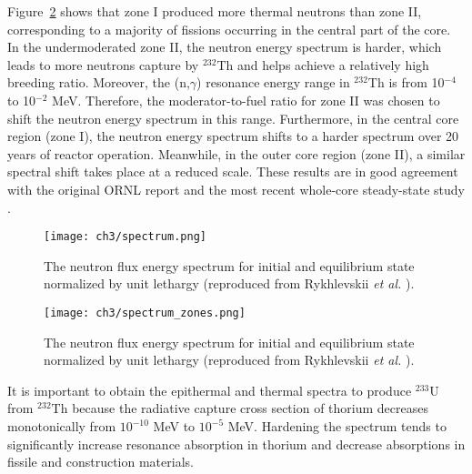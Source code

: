 Figure~\ref{fig:spectrum_zones} shows that zone I produced more thermal  
neutrons than zone II, corresponding to a majority of fissions occurring in 
the central part of the core. In the undermoderated zone II, the neutron 
energy spectrum is harder, which leads to more neutrons capture by $^{232}$Th 
and helps achieve a relatively high breeding ratio. Moreover, the (n,$\gamma$) 
resonance energy range in $^{232}$Th is from 10$^{-4}$ to 10$^{-2}$ MeV. 
Therefore, the moderator-to-fuel ratio for zone II was chosen to shift the 
neutron energy spectrum in this range. Furthermore, in the central core region 
(zone I), the neutron energy spectrum shifts to a harder spectrum over 20 
years of reactor operation. Meanwhile, in the outer core region (zone II), a 
similar spectral shift takes place at a reduced scale. These results are in  
good agreement with the original ORNL report \cite{robertson_conceptual_1971} 
and the most recent whole-core steady-state study \cite{park_whole_2015}.
\begin{figure}[htp!] %
	\centering
	\texttt{[image: ch3/spectrum.png]}
	\caption{The neutron flux energy spectrum for initial and equilibrium  
	state normalized by unit lethargy (reproduced from Rykhlevskii 
	\emph{et al.} \cite{rykhlevskii_modeling_2019}).}
	\label{fig:spectrum}
\end{figure}
\begin{figure}[htp!] %
	\centering
	\texttt{[image: ch3/spectrum\_zones.png]} 
	\caption{The neutron flux energy spectrum for initial and equilibrium  
		state normalized by unit lethargy (reproduced from 
		Rykhlevskii \emph{et al.} \cite{rykhlevskii_modeling_2019}).}
	\label{fig:spectrum_zones}
\end{figure}

It is important to obtain the epithermal and thermal spectra to produce 
$^{233}$U from $^{232}$Th because the radiative capture cross section of 
thorium decreases monotonically from $10^{-10}$ MeV to $10^{-5}$ MeV. 
Hardening the spectrum tends to significantly increase resonance absorption in 
thorium and decrease absorptions in fissile and construction materials. 

